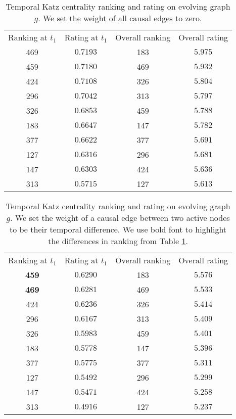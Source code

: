 \documentclass[12pt]{article}
\theoremstyle{definition}
\begin{document}
  \begin{table}[h]
    \begin{center}
  \begin{tabular}{ c | c | c | c }
    Ranking at $t_1$ & Rating at $t_1$ & Overall ranking & Overall rating \\
     469 & $0.7193$ & 183 & $5.975$ \\
     459 & $0.7180$ & 469 & $5.932$ \\
     424 & $0.7108$ & 326 & $5.804$ \\
     296 & $0.7042$ & 313 & $5.797$ \\
     326 & $0.6853$ & 459 & $5.788$ \\
     183 & $0.6647$ & 147 & $5.782$ \\
     377 & $0.6622$ & 377 & $5.691$ \\
     127 & $0.6316$ & 296 & $5.681$ \\
     147 & $0.6303$ & 424 & $5.636$ \\
     313 & $0.5715$ & 127 & $5.613$ \\
  \end{tabular}
  \end{center}
  \caption{Temporal Katz centrality ranking and rating on evolving graph $g$.
  We set the weight of all causal edges to zero.}
  \label{table:ranking}
  \end{table}

  \begin{table}[h]
    \begin{center}
  \begin{tabular}{ c | c | c | c }
    Ranking at $t_1$ & Rating at $t_1$ & Overall ranking & Overall rating \\
     \textbf{459} & $0.6290$ & 183 & $5.576$ \\
     \textbf{469} & $0.6281$ & 469 & $5.533$ \\
     424 & $0.6236$ & 326 & $5.414$ \\
     296 & $0.6167$ & 313 & $5.409$ \\
     326 & $0.5983$ & 459 & $5.401$ \\
     183 & $0.5778$ & 147 & $5.396$ \\
     377 & $0.5775$ & 377 & $5.311$ \\
     127 & $0.5492$ & 296 & $5.299$ \\
     147 & $0.5471$ & 424 & $5.258$ \\
     313 & $0.4916$ & 127 & $5.237$ \\
  \end{tabular}
  \end{center}
  \caption{Temporal Katz centrality ranking and rating on evolving graph $g$.
  We set the weight of a causal edge between two active nodes to be their temporal difference.
  We use bold font to highlight the differences in ranking from Table \ref{table:ranking}.}
  \label{table:ranking2}
  \end{table}
\end{document}
